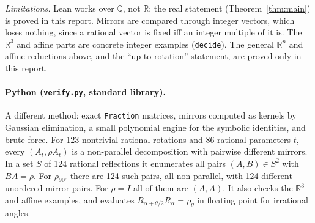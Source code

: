\documentclass[11pt]{article}
\theoremstyle{definition}
\theoremstyle{remark}
\newcommand{\Q}{\mathbb Q}
\newcommand{\R}{\mathbb R}
\begin{document}
\emph{Limitations.} Lean works over $\Q$, not $\R$; the real statement
(Theorem~\ref{thm:main}) is proved in this report. Mirrors are compared through integer
vectors, which loses nothing, since a rational vector is fixed iff an integer multiple of it is.
The $\R^3$ and affine parts are concrete integer examples (\texttt{decide}). The general $\R^n$
and affine reductions above, and the ``up to rotation'' statement, are proved only in this
report.

\paragraph{Python (\texttt{verify.py}, standard library).} A different method: exact
\texttt{Fraction} matrices, mirrors computed as kernels by Gaussian elimination, a small
polynomial engine for the symbolic identities, and brute force. For 123 nontrivial rational
rotations and 86 rational parameters $t$, every $(A_t,\rho A_t)$ is a non-parallel decomposition
with pairwise different mirrors. In a set $S$ of 124 rational reflections it enumerates all
pairs $(A,B)\in S^2$ with $BA=\rho$. For $\rho_{90^\circ}$ there are 124 such pairs, all
non-parallel, with 124 different unordered mirror pairs. For $\rho=I$ all of them are $(A,A)$.
It also checks the $\R^3$ and affine examples, and evaluates
$R_{\alpha+\theta/2}R_\alpha=\rho_\theta$ in floating point for irrational angles.
\end{document}
